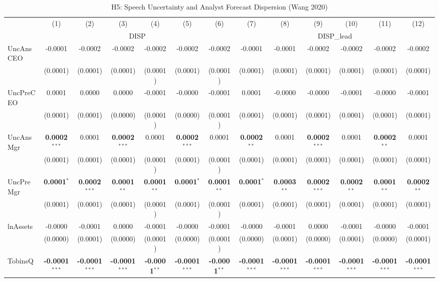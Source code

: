 \documentclass[11pt,a4paper]{article}
\begin{document}
\begin{table}[htbp]
\centering
\caption{H5: Speech Uncertainty and Analyst Forecast Dispersion (Wang 2020)}
\label{tab:h5}
\scriptsize
\begin{tabular}{lcccccccccccc}
\toprule
 & (1) & (2) & (3) & (4) & (5) & (6) & (7) & (8) & (9) & (10) & (11) & (12) \\
 & \multicolumn{6}{c}{DISP} & \multicolumn{6}{c}{DISP\_lead} \\
\cmidrule(lr){2-7} \cmidrule(lr){8-13}
\midrule
UncAnsCEO & -0.0001 & -0.0002 & -0.0002 & -0.0002 & -0.0002 & -0.0002 & -0.0001 & -0.0001 & -0.0002 & -0.0002 & -0.0002 & -0.0002 \\
 & (0.0001) & (0.0001) & (0.0001) & (0.0001) & (0.0001) & (0.0001) & (0.0001) & (0.0001) & (0.0001) & (0.0001) & (0.0001) & (0.0001) \\
UncPreCEO & 0.0001 & 0.0000 & 0.0000 & -0.0001 & -0.0000 & -0.0001 & 0.0001 & -0.0000 & -0.0000 & -0.0001 & -0.0000 & -0.0001 \\
 & (0.0001) & (0.0001) & (0.0000) & (0.0001) & (0.0000) & (0.0001) & (0.0001) & (0.0001) & (0.0001) & (0.0001) & (0.0001) & (0.0001) \\
UncAnsMgr & \textbf{0.0002}$^{***}$ & 0.0001 & \textbf{0.0002}$^{***}$ & 0.0001 & \textbf{0.0002}$^{***}$ & 0.0001 & \textbf{0.0002}$^{**}$ & 0.0001 & \textbf{0.0002}$^{***}$ & 0.0001 & \textbf{0.0002}$^{**}$ & 0.0001 \\
 & (0.0001) & (0.0001) & (0.0001) & (0.0001) & (0.0001) & (0.0001) & (0.0001) & (0.0001) & (0.0001) & (0.0001) & (0.0001) & (0.0001) \\
UncPreMgr & \textbf{0.0001}$^{*}$ & \textbf{0.0002}$^{***}$ & \textbf{0.0001}$^{**}$ & \textbf{0.0001}$^{**}$ & \textbf{0.0001}$^{*}$ & \textbf{0.0001}$^{**}$ & \textbf{0.0001}$^{*}$ & \textbf{0.0003}$^{**}$ & \textbf{0.0002}$^{***}$ & \textbf{0.0002}$^{**}$ & \textbf{0.0001}$^{**}$ & \textbf{0.0002}$^{**}$ \\
 & (0.0001) & (0.0001) & (0.0001) & (0.0001) & (0.0001) & (0.0001) & (0.0001) & (0.0001) & (0.0001) & (0.0001) & (0.0001) & (0.0001) \\
\midrule
lnAssets & -0.0000 & -0.0001 & 0.0000 & -0.0001 & -0.0000 & -0.0001 & -0.0000 & -0.0001 & 0.0000 & -0.0001 & -0.0000 & -0.0001 \\
 & (0.0000) & (0.0001) & (0.0000) & (0.0001) & (0.0000) & (0.0001) & (0.0000) & (0.0001) & (0.0000) & (0.0001) & (0.0000) & (0.0001) \\
TobinsQ & \textbf{-0.0001}$^{***}$ & \textbf{-0.0001}$^{***}$ & \textbf{-0.0001}$^{***}$ & \textbf{-0.0001}$^{**}$ & \textbf{-0.0001}$^{***}$ & \textbf{-0.0001}$^{**}$ & \textbf{-0.0001}$^{***}$ & \textbf{-0.0001}$^{***}$ & \textbf{-0.0001}$^{***}$ & \textbf{-0.0001}$^{***}$ & \textbf{-0.0001}$^{***}$ & \textbf{-0.0001}$^{***}$ \\

\end{tabular}
\end{table}
\end{document}
